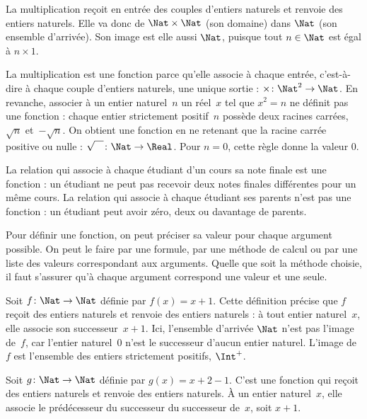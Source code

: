 \documentclass[../../../include/open-logic-section]{subfiles}
\begin{document}
\begin{ex}
La multiplication reçoit en entrée des couples d’entiers naturels et
renvoie des entiers naturels. Elle va donc de $\Nat \times \Nat$
(son domaine) dans $\Nat$ (son ensemble d’arrivée).
Son image est elle aussi $\Nat$, puisque tout $n \in \Nat$ est égal à
$n \times 1$.
\end{ex}

\begin{ex}
La multiplication est une fonction parce qu’elle associe à chaque entrée,
c’est-à-dire à chaque couple d’entiers naturels, une unique sortie :
$\times \colon \Nat^2 \to \Nat$. En revanche, associer à un entier
naturel~$n$ un réel~$x$ tel que $x^2 = n$ ne définit pas une fonction :
chaque entier strictement positif~$n$ possède deux racines carrées,
$\sqrt{n}$ et~$-\sqrt{n}$. On obtient une fonction en ne retenant que
la racine carrée positive ou nulle :
$\sqrt{\phantom{X}} \colon \Nat \to \Real$.
Pour $n=0$, cette règle donne la valeur $0$.
%
\end{ex}

\begin{ex}
La relation qui associe à chaque étudiant d’un cours sa note finale est
une fonction : un étudiant ne peut pas recevoir deux notes finales
différentes pour un même cours. La relation qui associe à chaque étudiant
ses parents n’est pas une fonction : un étudiant peut avoir zéro, deux
ou davantage de parents.
\end{ex}

\begin{explain}
Pour définir une fonction, on peut préciser sa valeur pour chaque
argument possible. On peut le faire par une formule, par une méthode
de calcul ou par une liste des valeurs correspondant aux arguments.
Quelle que soit la méthode choisie, il faut s’assurer qu’à chaque
argument correspond une valeur et une seule.
\end{explain}

\begin{ex}
Soit $f \colon \Nat \to \Nat$ définie par $f(x) = x+1$.
Cette définition précise que $f$ reçoit des entiers naturels et renvoie
des entiers naturels : à tout entier naturel~$x$, elle associe son
successeur~$x+1$. Ici, l’ensemble d’arrivée $\Nat$ n’est pas l’image
de~$f$, car l’entier naturel~$0$ n’est le successeur d’aucun entier naturel.
L’image de~$f$ est l’ensemble des entiers strictement positifs, $\Int^{+}$.
\end{ex}

\begin{ex}
Soit $g \colon \Nat \to \Nat$ définie par $g(x) = x+2-1$.
C’est une fonction qui reçoit des entiers naturels et renvoie des
entiers naturels. À un entier naturel~$x$, elle associe le prédécesseur
du successeur du successeur de~$x$, soit $x+1$.
%
%
\end{ex}
\end{document}
